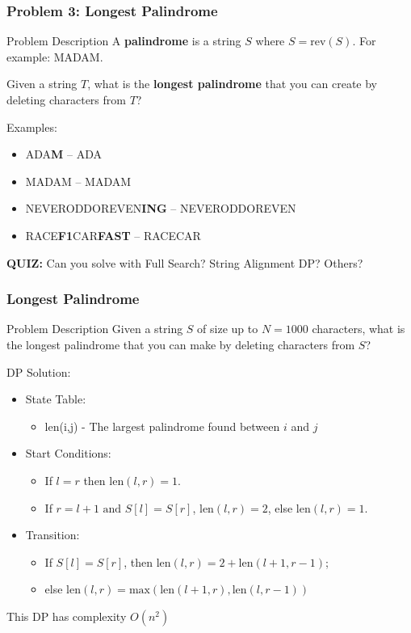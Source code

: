 \begin{frame}
  \frametitle{Problem 3: Longest Palindrome}
    \begin{block}{Problem Description}
      A {\bf palindrome} is a string $S$ where $S = \text{rev}(S)$. For example: MADAM.\bigskip

      Given a string $T$, what is the {\bf longest palindrome} that you can create by deleting characters from $T$?
    \end{block}

    Examples:
    \begin{itemize}
    \item ADA\alert{\bf M} -- ADA
    \item MADAM -- MADAM
    \item NEVERODDOREVEN\alert{\bf ING} -- NEVERODDOREVEN
    \item RACE\alert{\bf F1}CAR\alert{\bf FAST} -- RACECAR
    \end{itemize}\bigskip

    {\bf QUIZ:} Can you solve with Full Search? String Alignment DP? Others?
  \end{frame}

\begin{frame}
  \frametitle{Longest Palindrome}
    \begin{block}{Problem Description}
      Given a string $S$ of size up to $N = 1000$ characters, what is the
      longest palindrome that you can make by deleting characters from $S$?
    \end{block}

    DP Solution:
    \begin{itemize}
    \item State Table:
      {\smaller
      \begin{itemize}
      \item len(i,j) - The largest palindrome found between $i$ and $j$
      \end{itemize}}
    \item Start Conditions:
      {\smaller
      \begin{itemize}
        \item If $l=r$ then len$(l,r)=1$.
        \item If $r=l+1 \text{ and } S[l]=S[r]$, len$(l,r)=2$, else len$(l,r)=1$.
      \end{itemize}}
    \item Transition:
      {\smaller
      \begin{itemize}
        \item If $S[l]=S[r]$, then len$(l,r)=2+\text{len}(l+1,r-1)$;
        \item else $\text{len}(l,r) = \text{max}(\text{len}(l+1,r),\text{len}(l,r-1))$
      \end{itemize}}
    \end{itemize}

    This DP has complexity $O(n^2)$
\end{frame}

